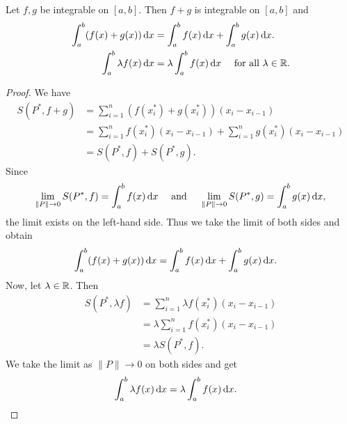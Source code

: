 \begin{theorem}
    Let $f,g$ be integrable on $[a,b]$. Then $f+g$ is integrable on $[a,b]$ and 
    \begin{align*}
        \int_a^b (f(x) + g(x)) \operatorname*{d\!} x &= \int_a^b f(x) \operatorname*{d\!} x + \int_a^b g(x) \operatorname*{d\!} x. \\
        \int_{a}^{b} \lambda f(x) \operatorname*{d\!} x &= \lambda \int_a^b f(x) \operatorname*{d\!} x \quad \text{ for all } \lambda \in \mathbb{R}.
    \end{align*}
\end{theorem}
\begin{proof}
    We have
    \begin{align*}
        S(P^*, f+g) &= \sum_{i=1}^{n} (f(x^*_i) + g(x^*_i)) (x_i - x_{i-1}) \\
        &= \sum_{i=1}^{n} f(x^*_i)(x_i - x_{i-1}) + \sum_{i=1}^{n} g(x^*_i)(x_i - x_{i-1}) \\
        &= S(P^*, f) + S(P^*, g).
    \end{align*}
    Since 
    \begin{align*}
        \lim_{\|P\|\to 0}S(P^*, f) = \int_{a}^{b} f(x) \operatorname*{d\!} x \quad \text{ and } \quad \lim_{\|P\|\to 0}S(P^*, g) = \int_{a}^{b} g(x) \operatorname*{d\!} x,
    \end{align*}
    the limit exists on the left-hand side. Thus we take the limit of both sides and obtain
    \begin{align*}
        \int_a^b (f(x) + g(x)) \operatorname*{d\!} x &= \int_a^b f(x) \operatorname*{d\!} x + \int_a^b g(x) \operatorname*{d\!} x.
    \end{align*}
    Now, let $\lambda \in \mathbb{R}$. Then
    \begin{align*}
        S(P^*, \lambda f) &= \sum_{i=1}^{n} \lambda f(x^*_i) (x_i - x_{i-1}) \\
        &= \lambda \sum_{i=1}^{n} f(x^*_i) (x_i - x_{i-1}) \\
        &= \lambda S(P^*, f).
    \end{align*} 
    We take the limit as $\|P\|\to 0$ on both sides and get
    \begin{align*}
        \int_{a}^{b} \lambda f(x) \operatorname*{d\!} x &= \lambda \int_a^b f(x) \operatorname*{d\!} x.
    \end{align*}
\end{proof}

